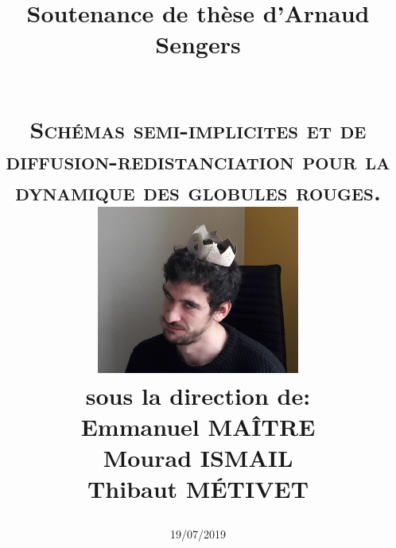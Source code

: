 \documentclass[a4paper]{leaflet}
\begin{document}
\begin{titlepage}
  \title{
    Soutenance de thèse d'Arnaud Sengers
    \date{19/07/2019} \\
    \textsc{Schémas semi-implicites et de diffusion-redistanciation pour la dynamique des globules rouges.}\\[1cm]    
    \includegraphics[width=0.5\textwidth]{crop} \\
 sous la direction de: \\
Emmanuel MAÎTRE \\
Mourad ISMAIL \\
Thibaut MÉTIVET
}
\end{titlepage}

\maketitle

\newpage
\end{document}
